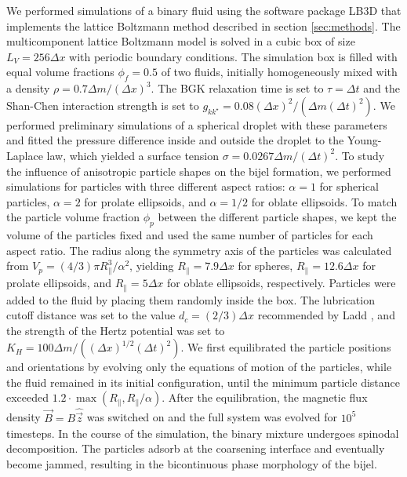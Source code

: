 We performed simulations of a binary fluid using the software package
LB3D \cite{schmieschek_lb3d_2017} that implements the lattice Boltzmann method described in section
\ref{sec:methods}. The multicomponent
lattice Boltzmann model is solved in a cubic box of size
\(L_V=256\Delta x\) with periodic boundary conditions. The simulation
box is filled with equal volume fractions \(\phi_f=0.5\) of two fluids,
initially homogeneously mixed with a density
\(\rho=0.7\Delta m/(\Delta x)^3\). The BGK relaxation time is set to
\(\tau=\Delta t\) and the Shan-Chen interaction strength is set to
\(g_{kk^\star}=0.08(\Delta x)^2/(\Delta m(\Delta t)^2)\). We performed
preliminary simulations of a spherical droplet with these parameters and
fitted the pressure difference inside and outside the droplet to the
Young-Laplace law, which yielded a surface tension
\(\sigma=0.0267\Delta m/(\Delta t)^2\). To study the influence of
anisotropic particle shapes on the bijel formation, we performed
simulations for particles with three different aspect ratios:
\(\alpha=1\) for spherical particles, \(\alpha=2\) for prolate
ellipsoids, and \(\alpha=1/2\) for oblate ellipsoids. To match the
particle volume fraction \(\phi_p\) between the different particle
shapes, we kept the volume of the particles fixed and used the same
number of particles for each aspect ratio. The radius along the symmetry
axis of the particles was calculated from
\(V_p=(4/3)\pi R_\parallel^3/\alpha^2\), yielding
\(R_\parallel=7.9\Delta x\) for spheres, \(R_\parallel=12.6\Delta x\)
for prolate ellipsoids, and \(R_\parallel=5\Delta x\) for oblate
ellipsoids, respectively. Particles were added to the fluid by placing
them randomly inside the box. The lubrication cutoff distance was set to
the value \(d_c=(2/3)\Delta x\) recommended by Ladd
\cite{ladd_lattice-boltzmann_2001}, and the strength of the Hertz
potential was set to \(K_H=100\Delta m/((\Delta x)^{1/2}(\Delta t)^2)\).
We first equilibrated the particle positions and orientations by
evolving only the equations of motion of the particles, while the fluid
remained in its initial configuration, until the minimum particle
distance exceeded \(1.2\cdot\max(R_\parallel,R_\parallel/\alpha)\).
After the equilibration, the magnetic flux density
\(\vec{B}=B\hat{\vec{z}}\) was switched on and the full system was
evolved for \(10^5\) timesteps. In the course of the simulation, the binary mixture undergoes spinodal decomposition. The particles adsorb at the coarsening interface and eventually become jammed, resulting in the bicontinuous phase morphology of the bijel.


